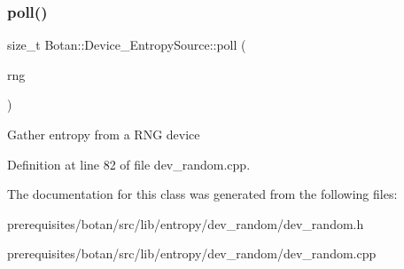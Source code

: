 \subsubsection{\texorpdfstring{poll()}{poll()}}
{\footnotesize\ttfamily size\+\_\+t Botan\+::\+Device\+\_\+\+Entropy\+Source\+::poll (\begin{DoxyParamCaption}\item[{Random\+Number\+Generator \&}]{rng }\end{DoxyParamCaption})\hspace{0.3cm}{\ttfamily [override]}}

Gather entropy from a R\+NG device 

Definition at line 82 of file dev\+\_\+random.\+cpp.



The documentation for this class was generated from the following files\+:\begin{DoxyCompactItemize}
\item 
prerequisites/botan/src/lib/entropy/dev\+\_\+random/dev\+\_\+random.\+h\item 
prerequisites/botan/src/lib/entropy/dev\+\_\+random/dev\+\_\+random.\+cpp\end{DoxyCompactItemize}
